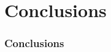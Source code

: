 \documentclass{beamer}
\begin{document}
\section{Conclusions}
\begin{frame}\frametitle{Conclusions}
\end{frame}
%
%
%

%
%
%
%
%
%
%
%
%
\end{document}
